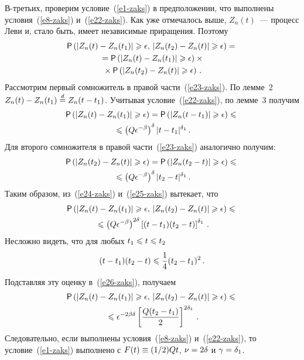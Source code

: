 \begin{multicols}{2}
В-третьих, проверим условие~(\ref{e1-zaks}) в предположении, что выполнены
условия~(\ref{e8-zaks}) и~(\ref{e22-zaks}). Как уже отмечалось выше, $Z_n(t)$~--- процесс
Леви и, стало быть, имеет независимые приращения. Поэтому
\begin{multline}
{\sf P}\left(|Z_n(t)-Z_n(t_1)|\geqslant\epsilon,\,|Z_n(t_2)-Z_n(t)|\geqslant\epsilon\right)={}\\
{}={\sf P}\left(|Z_n(t)-Z_n(t_1)|\geqslant\epsilon\right)\times{}\\
{}\times{\sf P}\left(|Z_n(t_2)-Z_n(t)|\geqslant\epsilon\right)\,.\label{e23-zaks}
\end{multline}
Рассмотрим первый сомножитель в правой час\-ти~(\ref{e23-zaks}). По лемме~2
$Z_n(t)\hm-Z_n(t_1)\eqd Z_n(t-t_1)$. Учитывая условие~(\ref{e22-zaks}), по лемме~3
получим
\begin{multline}
{\sf P}\left(|Z_n(t)-Z_n(t_1)|\geqslant\epsilon\right)={\sf P}
\left(|Z_n(t-t_1)|\geqslant\epsilon\right)\leqslant{}\\
{}\leqslant \left(Q\epsilon^{-\beta}\right)^{\delta}|t-t_1|^{\delta_1}\,.\label{e24-zaks}
\end{multline}
Для второго сомножителя в правой части~(\ref{e23-zaks}) аналогично получим:
\begin{multline}
{\sf P}\left(|Z_n(t_2)-Z_n(t)|\geqslant\epsilon\right)={\sf P}\left(|Z_n(t_2-t)|\geqslant\epsilon\right)\leqslant{}\\
{}\leqslant
\left(Q\epsilon^{-\beta}\right)^{\delta}|t_2-t|^{\delta_1}\,.\label{e25-zaks}
\end{multline}
Таким образом, из~(\ref{e24-zaks}) и~(\ref{e25-zaks}) вытекает, что
\begin{multline}
{\sf P}\left(|Z_n(t)-Z_n(t_1)|\geqslant\epsilon,\,|Z_n(t_2)-Z_n(t)|\geqslant\epsilon\right)\leqslant{}\\
{}\leqslant
\left(Q\epsilon^{-\beta}\right)^{2\delta}\left[(t-t_1)(t_2-t)\right]^{\delta_1}\,.\label{e26-zaks}
\end{multline}
Несложно видеть, что для любых $t_1\hm\leqslant t\hm\leqslant t_2$
$$
(t-t_1)(t_2-t)\leqslant\displaystyle\frac{\displaystyle 1\mathstrut}{\displaystyle 4\mathstrut}(t_2-t_1)^2\,.
$$
Подставляя эту оценку в~(\ref{e26-zaks}), получаем
\begin{multline*}
{\sf P}\left(|Z_n(t)-Z_n(t_1)|\geqslant\epsilon,\,|Z_n(t_2)-Z_n(t)|\geqslant\epsilon\right)\leqslant{}\\
{}\leqslant
\epsilon^{-2\beta\delta}\left[\displaystyle\frac{\displaystyle Q(t_2-t_1)\mathstrut}{\displaystyle 2\mathstrut}\right]^{2\delta_1}\,.
\end{multline*}
Следовательно, если выполнены условия~(\ref{e8-zaks}) и~(\ref{e22-zaks}), то условие~(\ref{e1-zaks})
выполнено с $F(t)\hm\equiv (1/2)Qt$, $\nu\hm=2\delta$ и
$\gamma\hm=\delta_1$.



\end{multicols}

